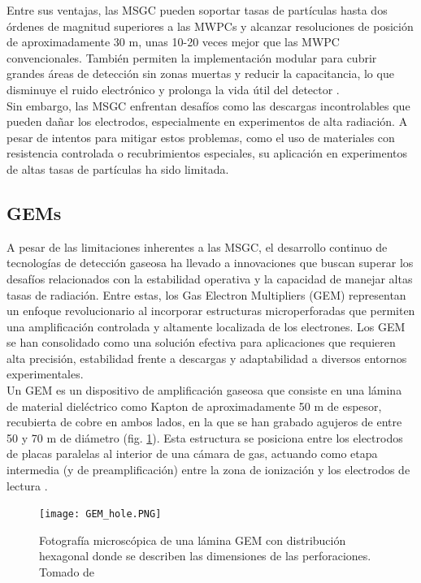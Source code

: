 \documentclass{article}
\begin{document}
\noindent Entre sus ventajas, las MSGC pueden soportar tasas de partículas hasta dos órdenes de magnitud superiores a las MWPCs y alcanzar resoluciones de posición de aproximadamente 30 \textmu m, unas 10-20 veces mejor que las MWPC convencionales. También permiten la implementación modular para cubrir grandes áreas de detección sin zonas muertas y reducir la capacitancia, lo que disminuye el ruido electrónico y prolonga la vida útil del detector \cite{giomataris1996micromegas}.\\

\noindent Sin embargo, las MSGC enfrentan desafíos como las descargas incontrolables que pueden dañar los electrodos, especialmente en experimentos de alta radiación. A pesar de intentos para mitigar estos problemas, como el uso de materiales con resistencia controlada o recubrimientos especiales, su aplicación en experimentos de altas tasas de partículas ha sido limitada.\\

\subsection{GEMs}

\noindent A pesar de las limitaciones inherentes a las MSGC, el desarrollo continuo de tecnologías de detección gaseosa ha llevado a innovaciones que buscan superar los desafíos relacionados con la estabilidad operativa y la capacidad de manejar altas tasas de radiación. Entre estas, los Gas Electron Multipliers (GEM) representan un enfoque revolucionario al incorporar estructuras microperforadas que permiten una amplificación controlada y altamente localizada de los electrones. Los GEM se han consolidado como una solución efectiva para aplicaciones que requieren alta precisión, estabilidad frente a descargas y adaptabilidad a diversos entornos experimentales. \\

\noindent Un GEM es un dispositivo de amplificación gaseosa que consiste en una lámina de material dieléctrico como Kapton de aproximadamente 50 \textmu m de espesor, recubierta de cobre en ambos lados, en la que se han grabado agujeros de entre 50 y 70 \textmu m de diámetro (fig. \ref{fig:gem_hole}). Esta estructura se posiciona entre los electrodos de placas paralelas al interior de una cámara de gas, actuando como etapa intermedia (y de preamplificación) entre la zona de ionización y los electrodos de lectura \cite{kolanoski2020particle4}.

\begin{figure}[H]
    \centering
    \texttt{[image: GEM\_hole.PNG]}
    \caption{Fotografía microscópica de una lámina GEM con distribución hexagonal donde se describen las dimensiones de las perforaciones. Tomado de \cite{sauli1997gem} }
    \label{fig:gem_hole}
\end{figure}
\end{document}
